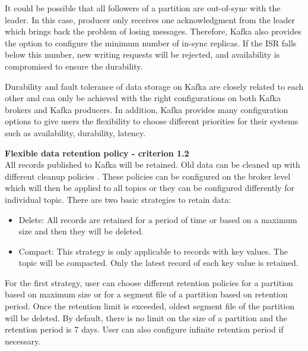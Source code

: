 It could be possible that all followers of a partition are out-of-sync with the leader. In this case, producer only receives one acknowledgment from the leader which brings back the problem of losing messages. Therefore, Kafka also provides the option to configure the minimum number of in-sync replicas. If the ISR falls below this number, new writing requests will be rejected, and availability is compromised to ensure the durability.

Durability and fault tolerance of data storage on Kafka are closely related to each other and can only be achieved with the right configurations on both Kafka brokers and Kafka producers. In addition, Kafka provides many configuration options to give users the flexibility to choose different priorities for their systems such as availability, durability, latency. 

\textbf{Flexible data retention policy - criterion 1.2}\\
All records published to Kafka will be retained. Old data can be cleaned up with different cleanup policies \cite{kafkadocumentation}. These policies can be configured on the broker level which will then be applied to all topics or they can be configured differently for individual topic. There are two basic strategies to retain data:
\begin{itemize}
	\item Delete: All records are retained for a period of time or based on a maximum size and then they will be deleted.
	\item Compact: This strategy is only applicable to records with key values. The topic will be compacted. Only the latest record of each key value is retained.
\end{itemize}

For the first strategy, user can choose different retention policies for a partition based on maximum size or for a segment file of a partition based on retention period. Once the retention limit is exceeded, oldest segment file of the partition will be deleted. By default, there is no limit on the size of a partition and the retention period is 7 days. User can also configure infinite retention period if necessary.

